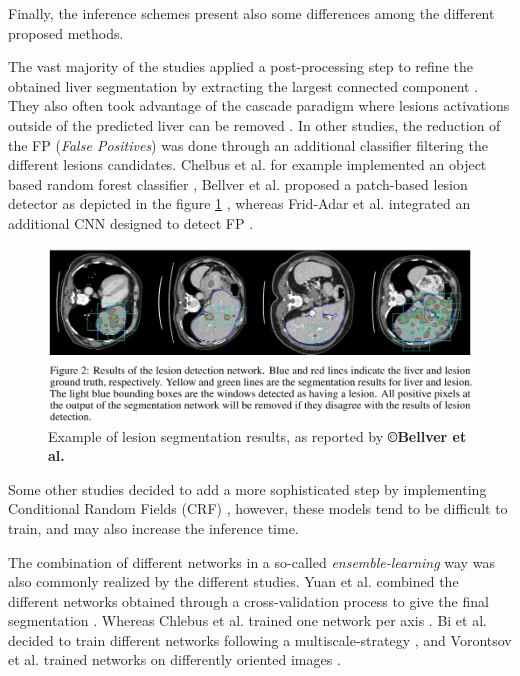 \documentclass[]{article}
\begin{document}
	
	Finally, the inference schemes present also some differences among the
	different proposed methods.
	
	The vast majority of the studies applied a post-processing step to
	refine the obtained liver segmentation by extracting the largest
	connected component \cite{Li2018, Han2017, Yuan2017, Bellver2017, Kaluva2018}. They
	also often took advantage of the cascade paradigm where lesions
	activations outside of the predicted liver can be removed \cite{Li2018, Yuan2017, Vorontsov2018}. In other studies, the reduction of the FP
	(\emph{False Positives}) was done through an additional classifier
	filtering the different lesions candidates. Chelbus et al. for
	example implemented an object based random forest classifier \cite{Chlebus2018},
	Bellver et al. proposed a patch-based lesion detector as
	depicted in the figure \ref{Bellver_predResults} \cite{Bellver2017}, whereas Frid-Adar et al. integrated an
	additional CNN designed to detect FP \cite{Frid-adar2017}.
	
	\begin{figure}[th!]
		\centering
		\includegraphics[width=0.7\linewidth]{images/image25}
		\caption{Example of lesion segmentation results, as reported by \textbf{©Bellver et al.} \cite{Bellver2017}}
		\label{Bellver_predResults}
	\end{figure}
	
	
	Some other studies decided to add a more sophisticated step by
	implementing Conditional Random Fields (CRF) \cite{Christ2017, Rafiei2018, Dou2016}, however, these models
	tend to be difficult to train, and may also
	increase the inference time.
	
	The combination of different networks in a so-called
	\emph{ensemble-learning} way was also commonly realized by the different
	studies. Yuan et al. combined the different networks obtained
	through a cross-validation process to give the final segmentation \cite{Yuan2017}.
	Whereas Chlebus et al. trained one network per axis \cite{Chlebus2018}. Bi et al. decided to train different networks following a
	multiscale-strategy \cite{Bi2017}, and Vorontsov et al. trained networks on
	differently oriented images \cite{Vorontsov2018}.
	
\end{document}
